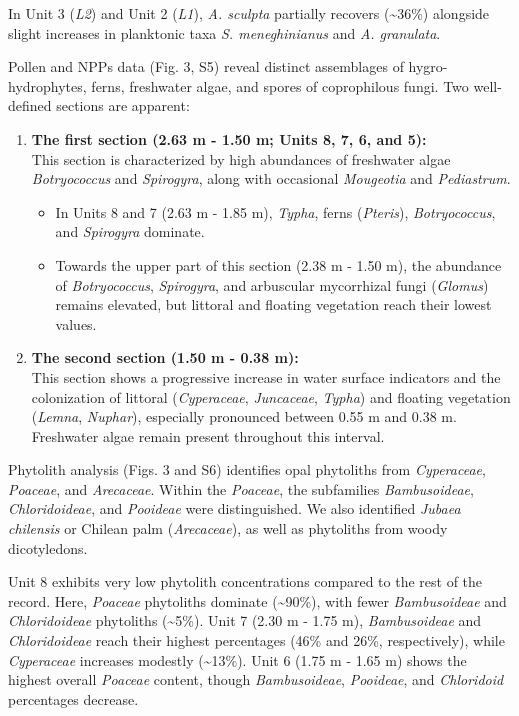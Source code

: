 \documentclass[
]{article}
\providecommand{\tightlist}{%
  \setlength{\itemsep}{0pt}\setlength{\parskip}{0pt}}
\begin{document}
In Unit 3 (\emph{L2}) and Unit 2 (\emph{L1}), \emph{A. sculpta}
partially recovers (\textasciitilde36\%) alongside slight increases in
planktonic taxa \emph{S. meneghinianus} and \emph{A. granulata}.

Pollen and NPPs data (Fig. 3, S5) reveal distinct assemblages of
hygro-hydrophytes, ferns, freshwater algae, and spores of coprophilous
fungi. Two well-defined sections are apparent:

\begin{enumerate}
\def\labelenumi{\arabic{enumi}.}
\tightlist
\item
  \textbf{The first section (2.63 m - 1.50 m; Units 8, 7, 6, and 5):}\\
  This section is characterized by high abundances of freshwater algae
  \emph{Botryococcus} and \emph{Spirogyra}, along with occasional
  \emph{Mougeotia} and \emph{Pediastrum}.

  \begin{itemize}
  \tightlist
  \item
    In Units 8 and 7 (2.63 m - 1.85 m), \emph{Typha}, ferns
    (\emph{Pteris}), \emph{Botryococcus}, and \emph{Spirogyra}
    dominate.\\
  \item
    Towards the upper part of this section (2.38 m - 1.50 m), the
    abundance of \emph{Botryococcus}, \emph{Spirogyra}, and arbuscular
    mycorrhizal fungi (\emph{Glomus}) remains elevated, but littoral and
    floating vegetation reach their lowest values.
  \end{itemize}
\item
  \textbf{The second section (1.50 m - 0.38 m):}\\
  This section shows a progressive increase in water surface indicators
  and the colonization of littoral (\emph{Cyperaceae}, \emph{Juncaceae},
  \emph{Typha}) and floating vegetation (\emph{Lemna}, \emph{Nuphar}),
  especially pronounced between 0.55 m and 0.38 m. Freshwater algae
  remain present throughout this interval.
\end{enumerate}

Phytolith analysis (Figs. 3 and S6) identifies opal phytoliths from
\emph{Cyperaceae}, \emph{Poaceae}, and \emph{Arecaceae}. Within the
\emph{Poaceae}, the subfamilies \emph{Bambusoideae},
\emph{Chloridoideae}, and \emph{Pooideae} were distinguished. We also
identified \emph{Jubaea chilensis} or Chilean palm (\emph{Arecaceae}),
as well as phytoliths from woody dicotyledons.

Unit 8 exhibits very low phytolith concentrations compared to the rest
of the record. Here, \emph{Poaceae} phytoliths dominate
(\textasciitilde90\%), with fewer \emph{Bambusoideae} and
\emph{Chloridoideae} phytoliths (\textasciitilde5\%). Unit 7 (2.30 m -
1.75 m), \emph{Bambusoideae} and \emph{Chloridoideae} reach their
highest percentages (46\% and 26\%, respectively), while
\emph{Cyperaceae} increases modestly (\textasciitilde13\%). Unit 6 (1.75
m - 1.65 m) shows the highest overall \emph{Poaceae} content, though
\emph{Bambusoideae}, \emph{Pooideae}, and \emph{Chloridoid} percentages
decrease.
\end{document}
